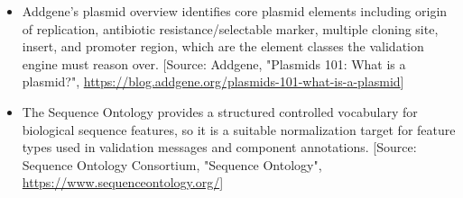 \documentclass[11pt]{report}
\begin{document}
\begin{itemize}
\item Addgene's plasmid overview identifies core plasmid elements including origin of replication, antibiotic resistance/selectable marker, multiple cloning site, insert, and promoter region, which are the element classes the validation engine must reason over. [Source: Addgene, "Plasmids 101: What is a plasmid?", \url{https://blog.addgene.org/plasmids-101-what-is-a-plasmid}]
\item The Sequence Ontology provides a structured controlled vocabulary for biological sequence features, so it is a suitable normalization target for feature types used in validation messages and component annotations. [Source: Sequence Ontology Consortium, "Sequence Ontology", \url{https://www.sequenceontology.org/}]
\end{itemize}
\end{document}
